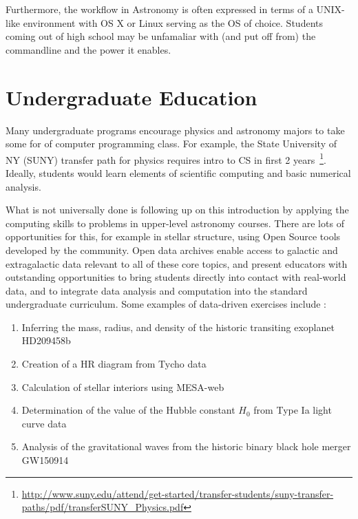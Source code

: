 \documentclass[11pt]{article}
\begin{document}
Furthermore, the workflow in Astronomy is often expressed in terms of
a UNIX-like environment with OS X or Linux serving as the OS of
choice.  Students coming out of high school may be unfamaliar with
(and put off from) the commandline and the power it enables.

\section{Undergraduate Education}

Many undergraduate programs encourage physics and astronomy majors to
take some for of computer programming class.  For example, the State
University of NY (SUNY) transfer path for physics requires intro to CS
in first 2
years~\footnote{\url{http://www.suny.edu/attend/get-started/transfer-students/suny-transfer-paths/pdf/transferSUNY_Physics.pdf}}.
Ideally, students would learn elements of scientific computing
and basic numerical analysis.

What is not universally done is following up on this introduction
by applying the computing skills to problems in upper-level
astronomy courses.  There are lots of opportunities for
this, for example in stellar structure, using Open Source
tools developed by the community. Open data archives enable access to galactic and extragalactic data relevant to all of these
core topics, and present educators with outstanding opportunities to bring students directly
into contact with real-world data, and to integrate data analysis  and computation into the
standard undergraduate curriculum. Some examples of data-driven exercises include :


\begin {enumerate}

\item Inferring the mass, radius, and density of the historic transiting exoplanet HD209458b

\item Creation of a HR diagram from Tycho data

\item Calculation of stellar interiors using MESA-web

\item Determination of the value of the Hubble constant $H_0$ from Type Ia light curve data

\item Analysis of the gravitational waves from the historic binary black hole merger GW150914

\end {enumerate}
\end{document}
